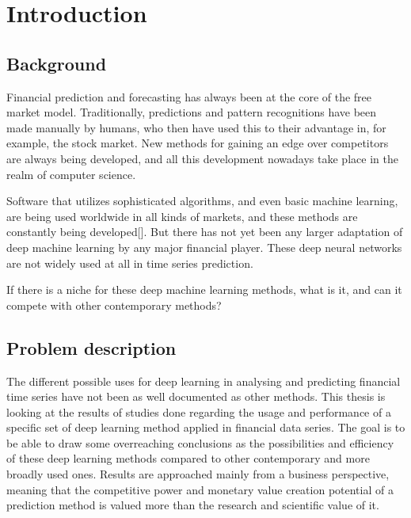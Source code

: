 \section{Introduction}

\subsection{Background}

Financial prediction and forecasting has always been at the core of the free market model. Traditionally, predictions and pattern recognitions have been made manually by humans, who then have used this to their advantage in, for example, the stock market. New methods for gaining an edge over competitors are always being developed, and all this development nowadays take place in the realm of computer science.

Software that utilizes sophisticated algorithms, and even basic machine learning, are being used worldwide in all kinds of markets, and these methods are constantly being developed[]. But there has not yet been any larger adaptation of deep machine learning by any major financial player. These deep neural networks are not widely used at all in time series prediction.

If there is a niche for these deep machine learning methods, what is it, and can it compete with other contemporary methods?




\subsection{Problem description}


The different possible uses for deep learning in analysing and predicting financial time series have not been as well documented as other methods. This thesis is looking at the results of studies done regarding the usage and performance of a specific set of deep learning method applied in financial data series. The goal is to be able to draw some overreaching conclusions as the possibilities and efficiency of these deep learning methods compared to other contemporary and more broadly used ones. Results are approached mainly from a business perspective, meaning that the competitive power and monetary value creation potential of a prediction method is valued more than the research and scientific value of it.


